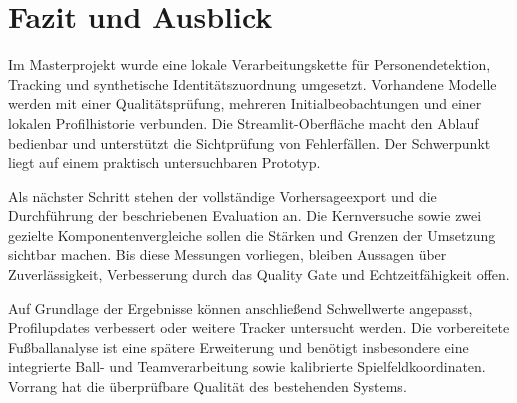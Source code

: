 \documentclass[runningheads]{llncs}
\begin{document}
\section{Fazit und Ausblick}

Im Masterprojekt wurde eine lokale Verarbeitungskette für Personendetektion, Tracking und synthetische Identitätszuordnung umgesetzt. Vorhandene Modelle werden mit einer Qualitätsprüfung, mehreren Initialbeobachtungen und einer lokalen Profilhistorie verbunden. Die Streamlit-Oberfläche macht den Ablauf bedienbar und unterstützt die Sichtprüfung von Fehlerfällen. Der Schwerpunkt liegt auf einem praktisch untersuchbaren Prototyp.

Als nächster Schritt stehen der vollständige Vorhersageexport und die Durchführung der beschriebenen Evaluation an. Die Kernversuche sowie zwei gezielte Komponentenvergleiche sollen die Stärken und Grenzen der Umsetzung sichtbar machen. Bis diese Messungen vorliegen, bleiben Aussagen über Zuverlässigkeit, Verbesserung durch das Quality Gate und Echtzeitfähigkeit offen.

Auf Grundlage der Ergebnisse können anschlie{\ss}end Schwellwerte angepasst, Profilupdates verbessert oder weitere Tracker untersucht werden. Die vorbereitete Fu{\ss}ballanalyse ist eine spätere Erweiterung und benötigt insbesondere eine integrierte Ball- und Teamverarbeitung sowie kalibrierte Spielfeldkoordinaten. Vorrang hat die überprüfbare Qualität des bestehenden Systems.

\end{document}
